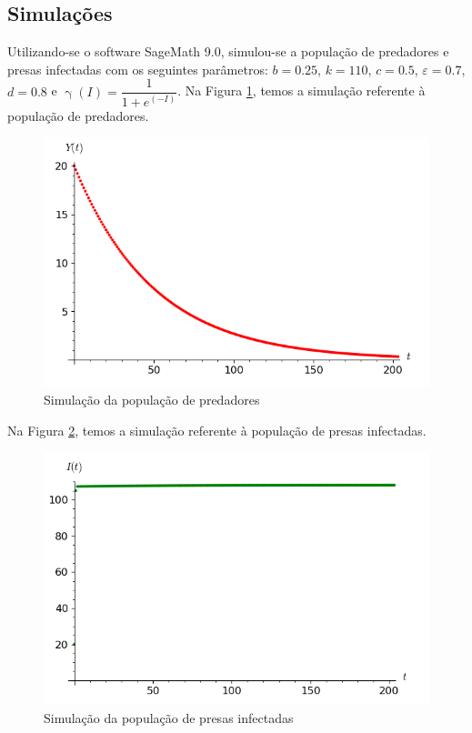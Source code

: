 \documentclass{article}
\begin{document}
\subsection{Simulações}
Utilizando-se o software SageMath 9.0, simulou-se a população de predadores e presas infectadas com os seguintes parâmetros: $b = 0.25$, $k = 110$, $c = 0.5$, $\varepsilon = 0.7$, $d = 0.8$ e $\upgamma(I) = \dfrac{1}{1 + e^{(- I)}}$. Na Figura \ref{fig:simulacao_Y}, temos a simulação referente à população de predadores.
\begin{figure}[H]
    \centering
    \includegraphics[scale = 0.7]{simulacao_Y.PNG} 
    \caption{Simulação da população de predadores}
    \label{fig:simulacao_Y}
\end{figure}

Na Figura \ref{fig:simulacao_I}, temos a simulação referente à população de presas infectadas.
\begin{figure}[H]
    \centering
    \includegraphics[scale = 0.7]{simulacao_I.PNG} 
    \caption{Simulação da população de presas infectadas}
    \label{fig:simulacao_I}
\end{figure}
\end{document}
